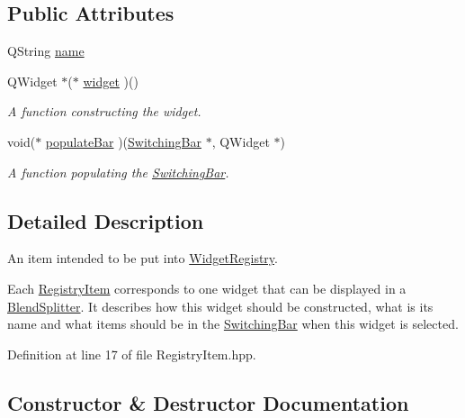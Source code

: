 \subsection*{Public Attributes}
\begin{DoxyCompactItemize}
\item 
Q\+String \hyperlink{class_registry_item_a662d7e2c473bea72a0549caf63ea5bfd}{name}
\item 
Q\+Widget $\ast$($\ast$ \hyperlink{class_registry_item_aa95c5a5dbfdf491e53b07dbc0a027e14}{widget} )()
\begin{DoxyCompactList}\small\item\em A function constructing the widget. \end{DoxyCompactList}\item 
void($\ast$ \hyperlink{class_registry_item_a0784869b48c86a581e12c88fd2706cd0}{populate\+Bar} )(\hyperlink{class_switching_bar}{Switching\+Bar} $\ast$, Q\+Widget $\ast$)
\begin{DoxyCompactList}\small\item\em A function populating the \hyperlink{class_switching_bar}{Switching\+Bar}. \end{DoxyCompactList}\end{DoxyCompactItemize}


\subsection{Detailed Description}
An item intended to be put into \hyperlink{class_widget_registry}{Widget\+Registry}. 

Each \hyperlink{class_registry_item}{Registry\+Item} corresponds to one widget that can be displayed in a \hyperlink{class_blend_splitter}{Blend\+Splitter}. It describes how this widget should be constructed, what is its name and what items should be in the \hyperlink{class_switching_bar}{Switching\+Bar} when this widget is selected. 

Definition at line 17 of file Registry\+Item.\+hpp.



\subsection{Constructor \& Destructor Documentation}
\hypertarget{class_registry_item_a6a4c02c5562dc8cbc61bee94f7a8db49}{}\label{class_registry_item_a6a4c02c5562dc8cbc61bee94f7a8db49} 
